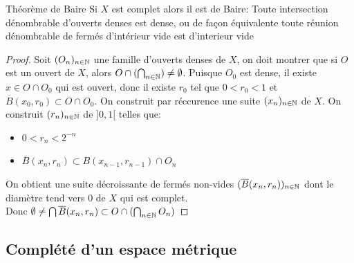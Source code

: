 \documentclass[]{report}
\begin{document}
    \begin{tm}{Théorème de Baire}{}
        Si $X$ est complet alors il est de Baire: Toute intersection dénombrable d'ouverts denses est dense, ou de façon équivalente toute réunion dénombrable de fermés d'intérieur vide est d'interieur vide
    \end{tm}

    \begin{proof}
        Soit $(O_n)_{n\in \mathbb{N}}$ une famille d'ouverts denses de $X$, on doit montrer que si $O$ est un ouvert de $X$, alors $O\cap(\bigcap_{{n\in\mathbb{N}}})\neq \emptyset$. Puisque $O_0$ est dense, il existe $x\in O\cap O_0$ qui est ouvert, donc il existe $r_0$ tel que $0<r_0<1$ et $\overline{B}(x_0,r_0)\subset O\cap O_0$. On construit par réccurence une suite $(x_n)_{{n\in\mathbb{N}}}$ de $X$. On construit $(r_n)_{n\in\mathbb{N}}$ de $]0,1[$ telles que:
        \begin{itemize}
            \item $0<r_n<2^{-n}$
            \item $\overline{B}(x_n,r_n)\subset B(x_{n-1},r_{n-1})\cap O_n$
        \end{itemize}
        On obtient une suite décroissante de fermés non-vides $(\overline{B}(x_n,r_n))_{n\in\mathbb{N}}$ dont le diamètre tend vers $0$ de $X$ qui est complet.\\
        Donc $\emptyset\neq \bigcap \overline{B}(x_n,r_n)\subset O\cap(\bigcap_{n\in\mathbb{N}} O_n)$
    \end{proof}

    \subsection*{Complété d'un espace métrique}
\end{document}
